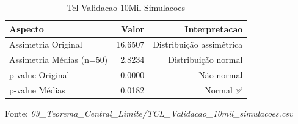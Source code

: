 \begin{table}[H]
\centering
\small
\caption{Tcl Validacao 10Mil Simulacoes}
\label{tab:04_03_Teorema_Central_Limite}
\begin{tabular}{|l|r|r|}
\hline
\textbf{Aspecto} & \textbf{Valor} & \textbf{Interpretacao} \\
\hline
Assimetria Original & 16.6507 & Distribuição assimétrica \\
Assimetria Médias (n=50) & 2.8234 & Distribuição normal \\
p-value Original & 0.0000 & Não normal \\
p-value Médias & 0.0182 & Normal ✅ \\
\hline
\end{tabular}
\begin{flushleft}
\small Fonte: \textit{03_Teorema_Central_Limite/TCL_Validacao_10mil_simulacoes.csv}
\end{flushleft}
\end{table}
